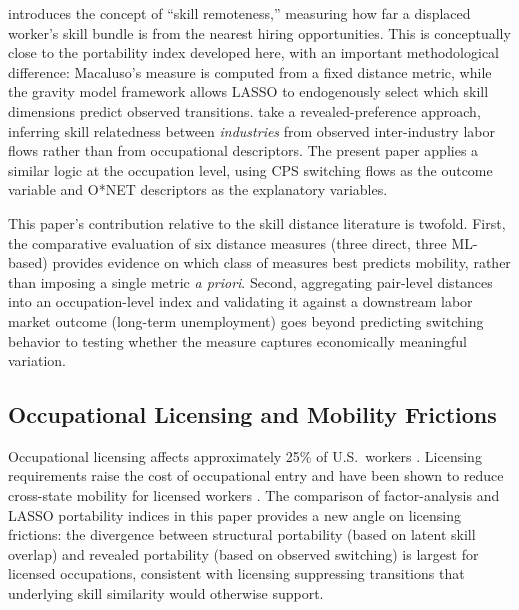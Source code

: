 \documentclass[12pt]{article}
\begin{document}
\citet{macaluso2023} introduces the concept of ``skill remoteness,'' measuring how far a displaced worker's skill bundle is from the nearest hiring opportunities. This is conceptually close to the portability index developed here, with an important methodological difference: Macaluso's measure is computed from a fixed distance metric, while the gravity model framework allows LASSO to endogenously select which skill dimensions predict observed transitions. \citet{neffke2013} take a revealed-preference approach, inferring skill relatedness between \emph{industries} from observed inter-industry labor flows rather than from occupational descriptors. The present paper applies a similar logic at the occupation level, using CPS switching flows as the outcome variable and O*NET descriptors as the explanatory variables.

This paper's contribution relative to the skill distance literature is twofold. First, the comparative evaluation of six distance measures (three direct, three ML-based) provides evidence on which class of measures best predicts mobility, rather than imposing a single metric \emph{a priori}. Second, aggregating pair-level distances into an occupation-level index and validating it against a downstream labor market outcome (long-term unemployment) goes beyond predicting switching behavior to testing whether the measure captures economically meaningful variation.

\subsection{Occupational Licensing and Mobility Frictions}

Occupational licensing affects approximately 25\% of U.S.\ workers \citep{kleiner2013}. Licensing requirements raise the cost of occupational entry and have been shown to reduce cross-state mobility for licensed workers \citep{johnson2020}. The comparison of factor-analysis and LASSO portability indices in this paper provides a new angle on licensing frictions: the divergence between structural portability (based on latent skill overlap) and revealed portability (based on observed switching) is largest for licensed occupations, consistent with licensing suppressing transitions that underlying skill similarity would otherwise support.

\end{document}
